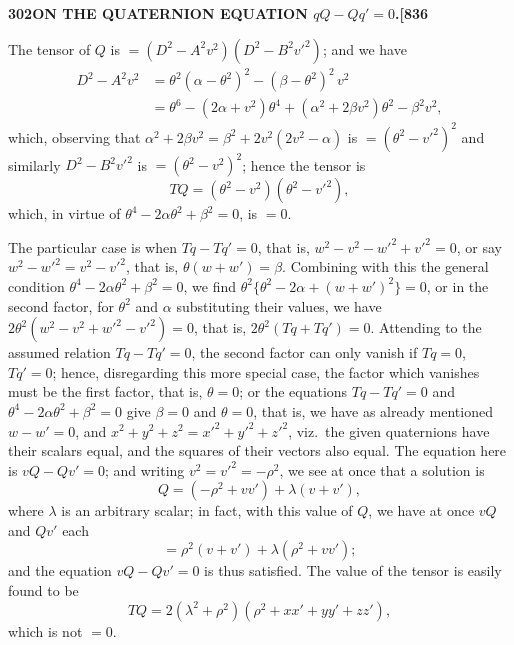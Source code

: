 \documentclass[11pt]{article}
\begin{document}
\newpage

\noindent\textbf{302}\hfill\textbf{ON THE QUATERNION EQUATION $qQ - Qq' = 0$.}\hfill\textbf{[836}

\bigskip

\noindent The tensor of $Q$ is $= (D^{2} - A^{2}v^{2})(D^{2} - B^{2}v'^{2})$; and we have
\begin{align*}
D^{2} - A^{2}v^{2} &= \theta^{2}(\alpha - \theta^{2})^{2} - (\beta - \theta^{2})^{2}\,v^{2} \\
                    &= \theta^{6} - (2\alpha + v^{2})\theta^{4} + (\alpha^{2} + 2\beta v^{2})\theta^{2} - \beta^{2}v^{2},
\end{align*}
which, observing that $\alpha^{2} + 2\beta v^{2} = \beta^{2} + 2v^{2}(2v^{2} - \alpha)$ is $= (\theta^{2} - v'^{2})^{2}$ and similarly $D^{2} - B^{2}v'^{2}$ is $= (\theta^{2} - v^{2})^{2}$; hence the tensor is
\[
TQ = (\theta^{2} - v^{2})(\theta^{2} - v'^{2}),
\]
which, in virtue of $\theta^{4} - 2\alpha\theta^{2} + \beta^{2} = 0$, is $= 0$.

\medskip

The particular case is when $Tq - Tq' = 0$, that is, $w^{2} - v^{2} - w'^{2} + v'^{2} = 0$, or say $w^{2} - w'^{2} = v^{2} - v'^{2}$, that is, $\theta(w + w') = \beta$. Combining with this the general condition $\theta^{4} - 2\alpha\theta^{2} + \beta^{2} = 0$, we find $\theta^{2}\{\theta^{2} - 2\alpha + (w + w')^{2}\} = 0$, or in the second factor, for $\theta^{2}$ and $\alpha$ substituting their values, we have $2\theta^{2}(w^{2} - v^{2} + w'^{2} - v'^{2}) = 0$, that is, $2\theta^{2}(Tq + Tq') = 0$. Attending to the assumed relation $Tq - Tq' = 0$, the second factor can only vanish if $Tq = 0$, $Tq' = 0$; hence, disregarding this more special case, the factor which vanishes must be the first factor, that is, $\theta = 0$; or the equations $Tq - Tq' = 0$ and $\theta^{4} - 2\alpha\theta^{2} + \beta^{2} = 0$ give $\beta = 0$ and $\theta = 0$, that is, we have as already mentioned $w - w' = 0$, and $x^{2} + y^{2} + z^{2} = x'^{2} + y'^{2} + z'^{2}$, viz.\ the given quaternions have their scalars equal, and the squares of their vectors also equal. The equation here is $vQ - Qv' = 0$; and writing $v^{2} = v'^{2} = -\rho^{2}$, we see at once that a solution is
\[
Q = (-\rho^{2} + vv') + \lambda(v + v'),
\]
where $\lambda$ is an arbitrary scalar; in fact, with this value of $Q$, we have at once $vQ$ and $Qv'$ each
\[
= \rho^{2}(v + v') + \lambda(\rho^{2} + vv');
\]
and the equation $vQ - Qv' = 0$ is thus satisfied. The value of the tensor is easily found to be
\[
TQ = 2(\lambda^{2} + \rho^{2})(\rho^{2} + xx' + yy' + zz'),
\]
which is not $= 0$.
\end{document}
